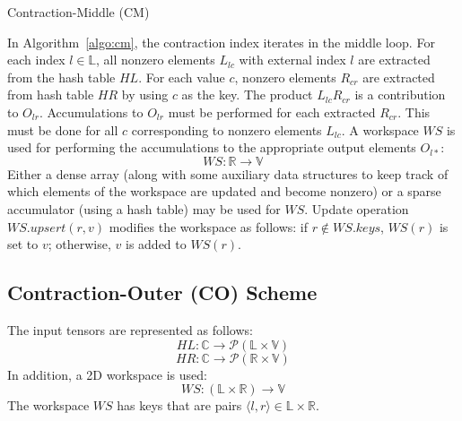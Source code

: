 \begin{algorithm}[h]
\DontPrintSemicolon
\LinesNumbered
{}
\caption{Contraction-Middle (CM)\label{algo:cm}}
\end{algorithm}
In Algorithm~\ref{algo:cm}, the contraction index iterates in the middle loop. For each index $l \in  \mathbb{L}$, all nonzero elements $L_{lc}$ with external index $l$ are extracted from the hash table $\mathit{HL}$.
For each value $c$, 
nonzero elements $R_{cr}$ are extracted from hash table $\mathit{HR}$ by using $c$ as the key. The product $L_{lc}R_{cr}$ is a contribution to $O_{lr}$. Accumulations to $O_{lr}$ must be performed for each extracted $R_{cr}$. This must be done for all $c$ corresponding to nonzero elements $L_{lc}$. 
A workspace $\mathit{WS}$ is used for performing the accumulations to the appropriate output elements $O_{l*}$:
$$\mathit{WS}: \mathbb{R} \rightarrow \mathbb{V} $$ Either a dense array (along with some auxiliary data structures to keep track of which elements of the workspace are updated and become nonzero) or a sparse accumulator (using a hash table) may be used for $\mathit{WS}$.
 Update operation $\mathit{WS}.\mathit{upsert}(r,v)$ modifies the workspace as follows: if $r \notin \mathit{WS}.\mathit{keys}$, $\mathit{WS}(r)$ is set to $v$; otherwise, $v$ is added to $\mathit{WS}(r)$. 

\subsection{Contraction-Outer (CO) Scheme} 
The input tensors are represented as follows:
$$\mathit{HL}: \mathbb{C} \rightarrow \mathcal{P}(\mathbb{L} \times \mathbb{V})$$
$$\mathit{HR}: \mathbb{C} \rightarrow \mathcal{P}(\mathbb{R} \times \mathbb{V})$$
In addition, a 2D workspace is used: 
$$\mathit{WS}: (\mathbb{L} \times \mathbb{R}) \rightarrow \mathbb{V} $$
The workspace $\mathit{WS}$ has keys that are pairs $\langle l, r \rangle \in \mathbb{L} \times \mathbb{R}$.

